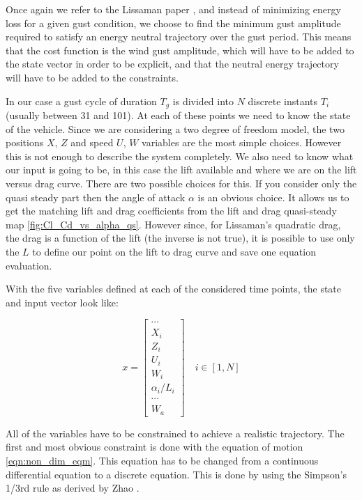 \par Once again we refer to the Lissaman paper \cite{Lissaman2007neutral}, and instead of minimizing energy loss for a given gust condition, we choose to find the minimum gust amplitude required to satisfy an energy neutral trajectory over the gust period.
This means that the cost function is the wind gust amplitude, which will have to be added to the state vector in order to be explicit, and that the neutral energy trajectory will have to be added to the constraints.

In our case a gust cycle of duration $T_g$ is divided into $N$ discrete instants $T_i$ (usually between 31 and 101).
At each of these points we need to know the state of the vehicle.
Since we are considering a two degree of freedom model, the two positions $X$, $Z$ and speed $U$, $W$ variables are the most simple choices.
However this is not enough to describe the system completely.
We also need to know what our input is going to be, in this case the lift available and where we are on the lift versus drag curve.
There are two possible choices for this.
If you consider only the quasi steady part then the angle of attack $\alpha$ is an obvious choice.
It allows us to get the matching lift and drag coefficients from the lift and drag quasi-steady map \ref{fig:Cl_Cd_vs_alpha_qs}.
However since, for Lissaman's quadratic drag, the drag is a function of the lift (the inverse is not true), it is possible to use only the $L$ to define our point on the lift to drag curve and save one equation evaluation.

\par With the five variables defined at each of the considered time points, the state and input vector look like:

\begin{equation}
  x= 
  \begin{bmatrix}
    \cdots \\
    X_i \\
    Z_i \\
    U_i \\
    W_i \\
    \alpha_i/L_i \\
    \cdots \\
    W_a
  \end{bmatrix}
  \quad i \in [1,N]
  \label{eqn:big_vector}
\end{equation}

\par All of the variables have to be constrained to achieve a realistic trajectory.
The first and most obvious constraint is done with the equation of motion \ref{eqn:non_dim_eqm}.
This equation has to be changed from a continuous differential equation to a discrete equation.
This is done by using the Simpson's 1/3rd rule as derived by Zhao \cite{zhao2004optimal}.

